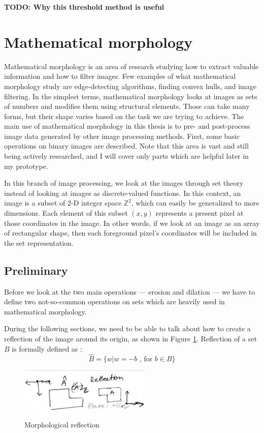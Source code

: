 \documentclass[
  digital,     %
  oneside,     %
  nosansbold,  %
  nocolorbold, %
  lof,         %
  lot,         %
]{fithesis4}
\newcommand*{\Z}{\ensuremath{\mathbb{Z}}}
\begin{document}
\textbf{TODO: Why this threshold method is useful}

\section{Mathematical morphology}

Mathematical morphology is an area of research studying how to extract valuable
information and how to filter images. Few examples of what mathematical
morphology study are edge-detecting algorithms, finding convex hulls, and image
filtering. In the simplest terms, mathematical morphology looks at images as
sets of numbers and modifies them using structural elements. Those can take many
forms, but their shape varies based on the task we are trying to achieve. The
main use of mathematical morphology in this thesis is to pre- and post-process
image data generated by other image processing methods. First, some basic
operations on binary images are described. Note that this area is vast and still
being actively researched, and I will cover only parts which are helpful later
in my prototype.

In this branch of image processing, we look at the images through set theory
instead of looking at images as discrete-valued functions. In this context, an
image is a subset of 2-D integer space $\Z^2$, which can easily be generalized
to more dimensions. Each element of this subset $(x, y)$ represents a present
pixel at those coordinates in the image. In other words, if we look at an image
as an array of rectangular shape, then each foreground pixel's coordinates will
be included in the set representation.

\subsection{Preliminary}
Before we look at the two main operations --- erosion and dilation --- we have to
define two not-so-common operations on sets which are heavily used in
mathematical morphology.

During the following sections, we need to be able to talk about how to create a
reflection of the image around its origin, as shown in Figure
\ref{fig:morp_refl}. Reflection  of a set $B$ is formally defined as \cite{gonzalez2002}:
$$\hat{B} = \{w | w=-b \text{ , for } b \in B\}$$
\begin{figure}
    \begin{center}
        \includegraphics[width=6.3cm]{resources/morph_reflection.jpg}
    \end{center}
    \caption{Morphological reflection} %
    \label{fig:morp_refl}
\end{figure}
\end{document}
